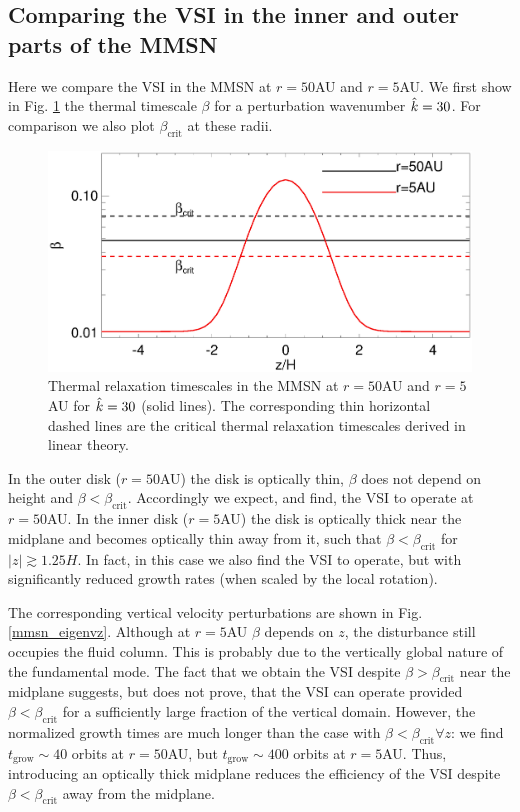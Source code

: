 \subsection{Comparing the VSI in the inner and outer parts of the MMSN} 
Here we compare the VSI in the MMSN at $r=50$AU and $r=5$AU. We first show in
Fig. \ref{beta_compare}  the thermal timescale $\beta$ for a
perturbation wavenumber $\hat{k}=30$. For comparison we also plot
$\beta_\mathrm{crit}$ at these radii.   

 \begin{figure}
  \includegraphics[width=\linewidth,clip=true,trim=0cm 0cm 0cm
  0cm]{figures/beta_compare}
  \caption{Thermal relaxation timescales in the MMSN at $r=50$AU
     and $r=5$AU for $\hat{k}=30$ (solid lines). The
    corresponding thin horizontal dashed lines are the critical thermal
    relaxation timescales derived in linear theory. 
    \label{beta_compare}}
\end{figure}

In the outer disk ($r=50$AU) the disk is optically thin, $\beta$ 
does not depend on height and $\beta <
\beta_\mathrm{crit}$. Accordingly we expect, and find, the VSI to
operate at $r=50$AU. In the inner disk ($r=5$AU) the disk is optically
thick near the midplane and becomes optically thin away from it, such
that $\beta < \beta_\mathrm{crit}$ for $|z|\gtrsim1.25H$. In
fact, in this case  we also find the VSI to operate, but with 
significantly reduced growth rates (when scaled by the local
rotation).  

The corresponding vertical velocity perturbations are shown in 
Fig. \ref{mmsn_eigenvz}. Although at $r=5$AU $\beta$ depends on $z$,
the disturbance still occupies the fluid column. This is probably due
to the vertically global nature of the fundamental mode. The fact that
we obtain the VSI despite $\beta > \beta_\mathrm{crit}$ near the
midplane suggests, but does not prove, that the VSI can operate
provided $\beta < \beta_\mathrm{crit}$ for a sufficiently large
fraction of the vertical domain. However, the normalized growth times
are much longer than the case with $\beta < \beta_\mathrm{crit}  \forall z$: we find $t_\mathrm{grow}\sim 40$ orbits at $r=50$AU,
but $t_\mathrm{grow}\sim 400$ orbits at $r=5$AU. Thus, introducing an
optically thick midplane reduces the efficiency of the VSI despite
$\beta < \beta_\mathrm{crit}$ away from the midplane. 

